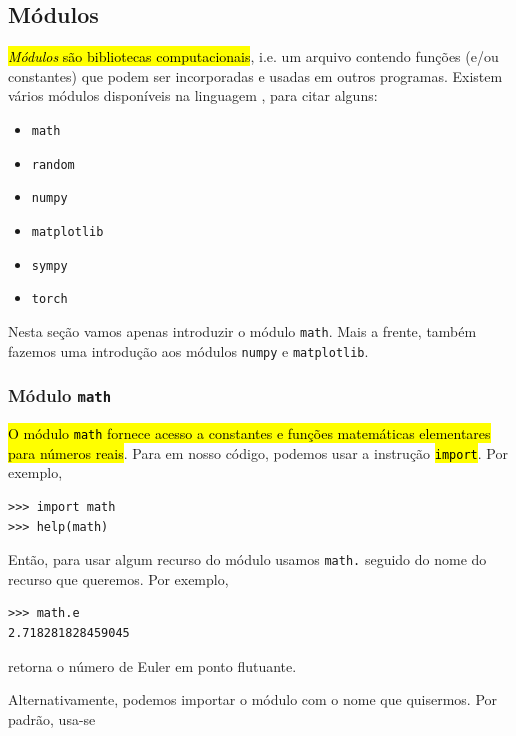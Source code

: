 \subsection{Módulos}

\hl{\emph{Módulos} são bibliotecas computacionais}, i.e. um arquivo contendo funções (e/ou constantes) que podem ser incorporadas e usadas em outros programas. Existem vários módulos disponíveis na linguagem {\python}, para citar alguns:
\begin{itemize}
\item \lstinline+math+ 
\item \lstinline+random+ 
\item \lstinline+numpy+ 
\item \lstinline+matplotlib+ 
\item \lstinline+sympy+ 
\item \lstinline+torch+ 
\end{itemize}

Nesta seção vamos apenas introduzir o módulo \lstinline+math+. Mais a frente, também fazemos uma introdução aos módulos \lstinline+numpy+ e \lstinline+matplotlib+.

\subsubsection{Módulo \lstinline+math+}

\hl{O módulo \texttt{math} fornece acesso a constantes e funções matemáticas elementares para números reais}. Para  em nosso código, podemos usar a instrução \hl{\texttt{import}}. Por exemplo,

\begin{lstlisting}
>>> import math
>>> help(math)
\end{lstlisting}

Então, para usar algum recurso do módulo usamos \lstinline+math.+ seguido do nome do recurso que queremos. Por exemplo,

\begin{lstlisting}
>>> math.e
2.718281828459045
\end{lstlisting}

retorna o número de Euler{\euler} em ponto flutuante.

Alternativamente, podemos importar o módulo com o nome que quisermos. Por padrão, usa-se

